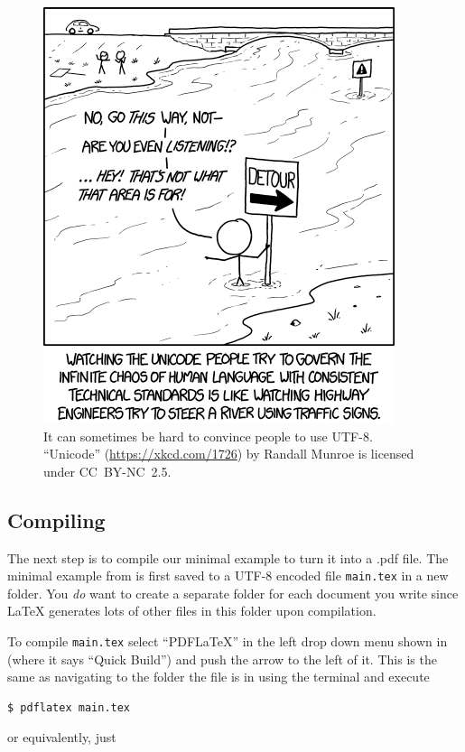 \begin{figure}
	\centering
	\includegraphics[scale=1,resolution=150]{graphics/unicode.png}
	\caption{It can sometimes be hard to convince people to use UTF-8. ``Unicode'' (\url{https://xkcd.com/1726}) by Randall Munroe is licensed under \mbox{CC~BY-NC~2.5}.}
	\label{fig:latex:unicode}
\end{figure}

\subsection{Compiling}\label{sec:latex:compiling}
The next step is to compile our minimal example to turn it into a .pdf file. The minimal example from  is first saved to a UTF-8 encoded file \texttt{main.tex} in a new folder. You \emph{do} want to create a separate folder for each document you write since \LaTeX{} generates lots of other files in this folder upon compilation.

To compile \verb|main.tex| select ``PDFLaTeX'' in the left drop down menu shown in  (where it says ``Quick Build'') and push the arrow to the left of it. This is the same as navigating to the folder the file is in using the terminal and execute

\begin{verbatim}
$ pdflatex main.tex
\end{verbatim}
or equivalently, just

